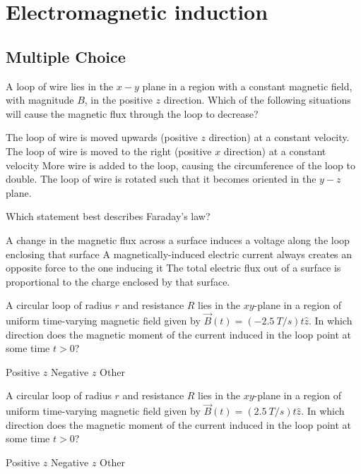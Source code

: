 \section{Electromagnetic induction}

\subsection{Multiple Choice}

\question A loop of wire lies in the $x-y$ plane in a region with a constant magnetic field, with magnitude $B$, in the positive $z$ direction. Which of the following situations will cause the magnetic flux through the loop to decrease?
\begin{checkboxes}
\choice The loop of wire is moved upwards (positive $z$ direction) at a constant velocity.
\choice The loop of wire is moved to the right (positive $x$ direction) at a constant velocity
\choice More wire is added to the loop, causing the circumference of the loop to double. 
\CorrectChoice The loop of wire is rotated such that it becomes oriented in the $y-z$ plane. \correct
\end{checkboxes}

\question Which statement best describes Faraday's law?
\begin{checkboxes}
\CorrectChoice A change in the magnetic flux across a surface induces a voltage along the loop enclosing that surface \correct
\choice A magnetically-induced electric current always creates an opposite force to the one inducing it
\choice The total electric flux out of a surface is proportional to the charge enclosed by that surface. 
\end{checkboxes}

\question A circular loop of radius $r$ and resistance $R$ lies in the $xy$-plane in a region of uniform time-varying magnetic field given by $\vec B(t)=(\SI{-2.5}{T/s})t\hat z$. In which direction does the magnetic moment of the current induced in the loop point at some time $t>0$?
\begin{checkboxes}
\CorrectChoice Positive $z$ \correct
\choice Negative $z$
\choice Other
\end{checkboxes}

\question A circular loop of radius $r$ and resistance $R$ lies in the $xy$-plane in a region of uniform time-varying magnetic field given by $\vec B(t)=(\SI{2.5}{T/s})t\hat z$. In which direction does the magnetic moment of the current induced in the loop point at some time $t>0$?
\begin{checkboxes}
\choice Positive $z$ 
\CorrectChoice Negative $z$ \correct
\choice Other
\end{checkboxes}

